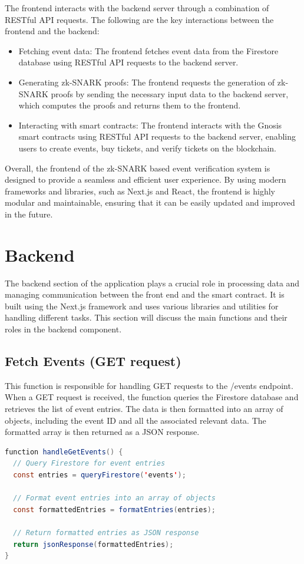 The frontend interacts with the backend server through a combination of RESTful API requests. The following are the key interactions between the frontend and the backend:

\begin{itemize}
\item Fetching event data: The frontend fetches event data from the Firestore database using RESTful API requests to the backend server.
\item Generating zk-SNARK proofs: The frontend requests the generation of zk-SNARK proofs by sending the necessary input data to the backend server, which computes the proofs and returns them to the frontend.
\item Interacting with smart contracts: The frontend interacts with the Gnosis smart contracts using RESTful API requests to the backend server, enabling users to create events, buy tickets, and verify tickets on the blockchain.
\end{itemize}

Overall, the frontend of the zk-SNARK based event verification system is designed to provide a seamless and efficient user experience. By using modern frameworks and libraries, such as Next.js and React, the frontend is highly modular and maintainable, ensuring that it can be easily updated and improved in the future.

\section{Backend}
The backend section of the application plays a crucial role in processing data and managing communication between the front end and the smart contract. It is built using the Next.js framework and uses various libraries and utilities for handling different tasks. This section will discuss the main functions and their roles in the backend component.

\subsection{Fetch Events (GET request)}
This function is responsible for handling GET requests to the /events endpoint. When a GET request is received, the function queries the Firestore database and retrieves the list of event entries. The data is then formatted into an array of objects, including the event ID and all the associated relevant data. The formatted array is then returned as a JSON response.

\begin{lstlisting}[language=Java, name={Fetch Events Function}, label={sc:fetchEvents}]
function handleGetEvents() {
  // Query Firestore for event entries
  const entries = queryFirestore('events');

  // Format event entries into an array of objects
  const formattedEntries = formatEntries(entries);

  // Return formatted entries as JSON response
  return jsonResponse(formattedEntries);
}
\end{lstlisting}

